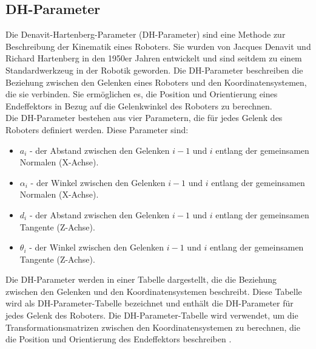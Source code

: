\subsection{DH-Parameter}\label{subsec:DHParameter}
Die Denavit-Hartenberg-Parameter (DH-Parameter) sind eine Methode zur Beschreibung der Kinematik eines Roboters. Sie wurden von Jacques Denavit und Richard Hartenberg in den 1950er Jahren entwickelt und sind seitdem zu einem Standardwerkzeug in der Robotik geworden. Die DH-Parameter beschreiben die Beziehung zwischen den Gelenken eines Roboters und den Koordinatensystemen, die sie verbinden. Sie ermöglichen es, die Position und Orientierung eines Endeffektors in Bezug auf die Gelenkwinkel des Roboters zu berechnen.\\
Die DH-Parameter bestehen aus vier Parametern, die für jedes Gelenk des Roboters definiert werden. Diese Parameter sind:
\begin{itemize}
    \item $a_i$ - der Abstand zwischen den Gelenken $i-1$ und $i$ entlang der gemeinsamen Normalen (X-Achse).
    \item $\alpha_i$ - der Winkel zwischen den Gelenken $i-1$ und $i$ entlang der gemeinsamen Normalen (X-Achse).
    \item $d_i$ - der Abstand zwischen den Gelenken $i-1$ und $i$ entlang der gemeinsamen Tangente (Z-Achse).
    \item $\theta_i$ - der Winkel zwischen den Gelenken $i-1$ und $i$ entlang der gemeinsamen Tangente (Z-Achse).
\end{itemize}
Die DH-Parameter werden in einer Tabelle dargestellt, die die Beziehung zwischen den Gelenken und den Koordinatensystemen beschreibt. Diese Tabelle wird als DH-Parameter-Tabelle bezeichnet und enthält die DH-Parameter für jedes Gelenk des Roboters. Die DH-Parameter-Tabelle wird verwendet, um die Transformationsmatrizen zwischen den Koordinatensystemen zu berechnen, die die Position und Orientierung des Endeffektors beschreiben \cite{msi_robo_vorlesung}.\\

